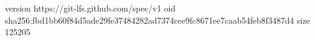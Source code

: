 version https://git-lfs.github.com/spec/v1
oid sha256:fbd1bb60f84d5ade29fe37484282ad7374cee9fc8671ee7caab54feb8f3487d4
size 125205
